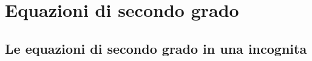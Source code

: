 
\chapter{Equazioni di secondo grado}

%   

%   

% 

\section{Le equazioni di secondo grado in una incognita}
\label{sec:eq2gr_definizione}

